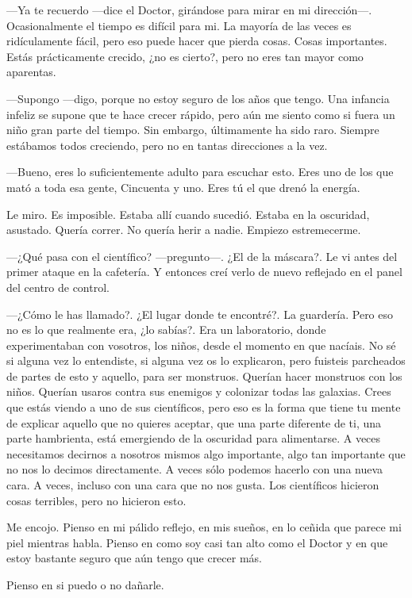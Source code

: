 ---Ya te recuerdo ---dice el Doctor, girándose para mirar en mi
dirección---. Ocasionalmente el tiempo es difícil para mi. La mayoría de
las veces es ridículamente fácil, pero eso puede hacer que pierda
cosas. Cosas importantes. Estás prácticamente crecido, ¿no es cierto?,
pero no eres tan mayor como aparentas.

---Supongo ---digo, porque no estoy seguro de los años que tengo. Una
infancia infeliz se supone que te hace crecer rápido, pero aún me siento
como si fuera un niño gran parte del tiempo. Sin embargo, últimamente ha
sido raro. Siempre estábamos todos creciendo, pero no en tantas
direcciones a la vez.

---Bueno, eres lo suficientemente adulto para escuchar esto. Eres uno de
los que mató a toda esa gente, Cincuenta y uno. Eres tú el que drenó la
energía.

Le miro. Es imposible. Estaba allí cuando sucedió. Estaba en la
oscuridad, asustado. Quería correr. No quería herir a nadie. Empiezo
estremecerme.

---¿Qué pasa con el científico? ---pregunto---. ¿El de la máscara?. Le
vi antes del primer ataque en la cafetería. Y entonces creí verlo de
nuevo reflejado en el panel del centro de control.

---¿Cómo le has llamado?. ¿El lugar donde te encontré?. La
guardería. Pero eso no es lo que realmente era, ¿lo sabías?. Era un
laboratorio, donde experimentaban con vosotros, los niños, desde el
momento en que nacíais. No sé si alguna vez lo entendiste, si alguna vez
os lo explicaron, pero fuisteis parcheados de partes de esto y aquello,
para ser monstruos. Querían hacer monstruos con los niños. Querían
usaros contra sus enemigos y colonizar todas las galaxias. Crees que
estás viendo a uno de sus científicos, pero eso es la forma que tiene tu
mente de explicar aquello que no quieres aceptar, que una parte
diferente de ti, una parte hambrienta, está emergiendo de la oscuridad
para alimentarse. A veces necesitamos decirnos a nosotros mismos algo
importante, algo tan importante que no nos lo decimos directamente. A
veces sólo podemos hacerlo con una nueva cara. A veces, incluso con una
cara que no nos gusta. Los científicos hicieron cosas terribles, pero no
hicieron esto.

Me encojo. Pienso en mi pálido reflejo, en mis sueños, en lo ceñida que
parece mi piel mientras habla. Pienso en como soy casi tan alto como el
Doctor y en que estoy bastante seguro que aún tengo que crecer más.

Pienso en si puedo o no dañarle.

